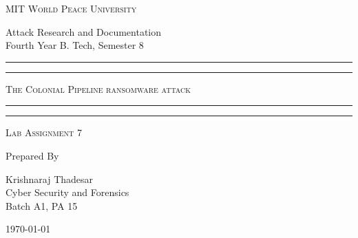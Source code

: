 \documentclass[11pt]{article}
\begin{document}
\begin{titlepage}
	\centering


	\huge\textsc{
		MIT World Peace University
	}\\

	\vspace{0.75\baselineskip} %

	\LARGE{
		Attack Research and Documentation\\
		Fourth Year B. Tech, Semester 8
	}

	\vfill %


	\rule{\textwidth}{1.6pt}\vspace*{-\baselineskip}\vspace*{2pt}
	\rule{\textwidth}{0.6pt}
	\vspace{0.75\baselineskip} %

	\huge{\textsc{
        The Colonial Pipeline ransomware attack
        }} \\

	\vspace{0.5\baselineskip} %
	\rule{\textwidth}{0.6pt}\vspace*{-\baselineskip}\vspace*{2.8pt}
	\rule{\textwidth}{1.6pt}

	\vspace{1\baselineskip} %


	\LARGE\textsc{
		Lab Assignment 7
	} %
	\vfill


	Prepared By \vspace{0.5\baselineskip} %

	\Large{
		Krishnaraj Thadesar \\
		Cyber Security and Forensics\\
        Batch A1, PA 15
	}

	\vspace{0.5\baselineskip} %
	\today

\end{titlepage}
\end{document}

